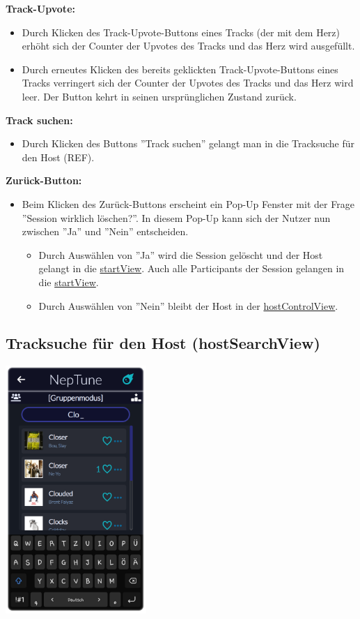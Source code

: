 \documentclass[oneside, ngerman]{sdqtechreport}
\begin{document}
\textbf{Track-Upvote:}
\begin{itemize}
    \item Durch Klicken des Track-Upvote-Buttons eines Tracks (der mit dem Herz) erhöht sich der Counter der Upvotes des Tracks und das Herz wird ausgefüllt.
    \item Durch erneutes Klicken des bereits geklickten Track-Upvote-Buttons eines Tracks verringert sich der Counter der Upvotes des Tracks und das Herz wird leer. Der Button kehrt in seinen ursprünglichen Zustand zurück.
\end{itemize}

\textbf{Track suchen:}
\begin{itemize}
    \item Durch Klicken des Buttons ''Track suchen'' gelangt man in die Tracksuche für den Host (REF).
\end{itemize}

\textbf{Zurück-Button:}
\begin{itemize}
    \item Beim Klicken des Zurück-Buttons erscheint ein Pop-Up Fenster mit der Frage ''Session wirklich löschen?''. In diesem Pop-Up kann sich der Nutzer nun zwischen ''Ja'' und ''Nein'' entscheiden.
    \begin{itemize}
        \item Durch Auswählen von ''Ja'' wird die Session gelöscht und der Host gelangt in die \hyperlink{startView}{startView}. Auch alle Participants der Session gelangen in die \hyperlink{startView}{startView}.
        \item Durch Auswählen von ''Nein'' bleibt der Host in der \hyperlink{hostControlView}{hostControlView}.
    \end{itemize}
\end{itemize}

\subsection{Tracksuche für den Host (hostSearchView)}
\label{sec:Benutzeroberfläche:hostSearchView}


\begin{center}
    \hypertarget{hostSearchView}{}
    \includegraphics[width=0.4\textwidth]{LATEX/Pflichtenheft/GraphicDesigns/hostSearchPage.png}
\end{center}
\end{document}
